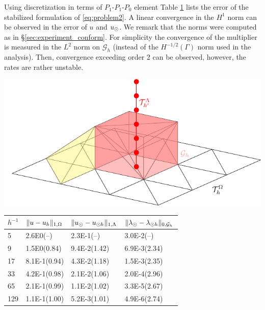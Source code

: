 Using discretization in terms of $P_1$-$P_1$-$P_0$ element Table \ref{tab:error_unfit}
lists the error of the stabilized formulation of \eqref{eq:problem2}. A linear
convergence in the $H^1$ norm can be observed in the error of $u$ and $u_{\odot}$. We
remark that the norms were computed as in \S\ref{sec:experiment_conform}. For simplicity
the convergence of the multiplier is measured in the $L^2$ norm
on $\mathcal{G}_h$ (instead of the $H^{-1/2}(\Gamma)$ norm used in the analysis).
Then, convergence exceeding order 2 can be observed, however, the rates are rather
unstable. 

\begin{table}
\begin{minipage}[b]{0.35\linewidth}
 \centering
 \includegraphics[width=\textwidth]{graphics/nonconform_mesh.pdf}
 \vspace{-20pt}
\label{fig:unfit}
\end{minipage}
\hspace{2pt}
    \begin{minipage}[b]{0.62\linewidth}
  \scriptsize{
  \begin{center}
    \begin{tabular}{l|lll}
      \toprule
    $h^{-1}$ & $\lVert{u-u_h}\rVert_{1, \Omega}$ & $\lVert{u_{\odot}-u_{\odot h}}\rVert_{1, \Lambda}$ & $\lVert{\lambda_{\odot}-\lambda_{\odot h}}\rVert_{0,\mathcal{G}_h}$\\
      \hline
5   & 2.6E0(--)    & 2.3E-1(--)   & 3.0E-2(--)\\
9   & 1.5E0(0.84)  & 9.4E-2(1.42) & 6.9E-3(2.34)\\
17  & 8.1E-1(0.94) & 4.3E-2(1.18) & 1.5E-3(2.35)\\
33  & 4.2E-1(0.98) & 2.1E-2(1.06) & 2.0E-4(2.96)\\
65  & 2.1E-1(0.99) & 1.1E-2(1.02) & 3.3E-5(2.67)\\
129 & 1.1E-1(1.00) & 5.2E-3(1.01) & 4.9E-6(2.74)\\
\bottomrule
    \end{tabular}
  \end{center}    
}    
  \label{tab:error_unfit}    
  \end{minipage}
\end{table}

